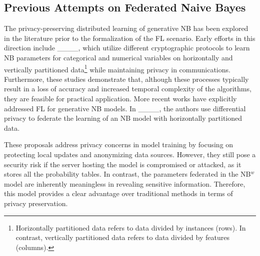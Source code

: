 \subsection{Previous Attempts on Federated Naive Bayes}\label{subsec:relatedWorkNB}

The privacy-preserving distributed learning of generative NB has been explored in the literature prior to the formalization of the FL scenario. Early efforts in this direction include ____, which utilize different cryptographic protocols to learn NB parameters for categorical and numerical variables on horizontally and vertically partitioned data\footnote{Horizontally partitioned data refers to data divided by instances (rows). In contrast, vertically partitioned data refers to data divided by features (columns).} while maintaining privacy in communications. Furthermore, these studies demonstrate that, although these processes typically result in a loss of accuracy and increased temporal complexity of the algorithms, they are feasible for practical application. More recent works have explicitly addressed FL for generative NB models. In ____, the authors use differential privacy to federate the learning of an NB model with horizontally partitioned data.

These proposals address privacy concerns in model training by focusing on protecting local updates and anonymizing data sources. However, they still pose a security risk if the server hosting the model is compromised or attacked, as it stores all the probability tables. In contrast, the parameters federated in the NB$^w$ model are inherently meaningless in revealing sensitive information. Therefore, this model provides a clear advantage over traditional methods in terms of privacy preservation.

%
%
